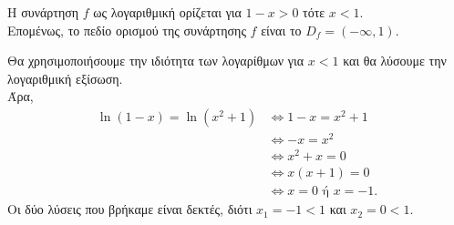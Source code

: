 \begin{alist}
\item Η συνάρτηση $f$ ως λογαριθμική ορίζεται για $1 - x > 0$ τότε $x < 1$. \\
Επομένως, το πεδίο ορισμού της συνάρτησης $f$ είναι το $D_f = (-\infty, 1)$.
\item Θα χρησιμοποιήσουμε την ιδιότητα των λογαρίθμων για $x < 1$ και θα λύσουμε την λογαριθμική εξίσωση. \\
Άρα,
\begin{align*}
\ln(1 - x) = \ln(x^2 + 1) &\Leftrightarrow 1 - x = x^2 + 1 \\
&\Leftrightarrow -x = x^2 \\
&\Leftrightarrow x^2 + x = 0 \\
&\Leftrightarrow x(x + 1) = 0 \\
&\Leftrightarrow x = 0 \text{ ή } x = -1.
\end{align*}
Οι δύο λύσεις που βρήκαμε είναι δεκτές, διότι $x_1 = -1 < 1$ και $x_2 = 0 < 1$.
\end{alist}


